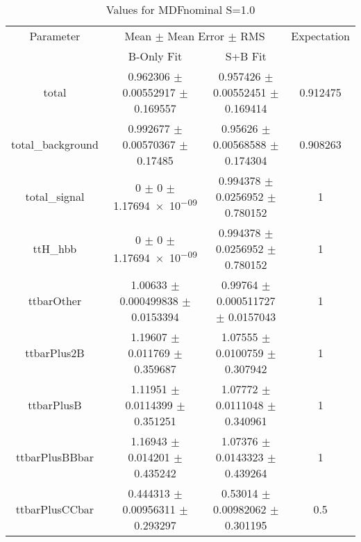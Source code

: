 \begin{table}
\centering
\caption{Values for MDFnominal S=1.0}
\begin{tabular}{cccc}
\toprule
Parameter & \multicolumn{2}{c}{Mean $\pm$ Mean Error $\pm$ RMS} & Expectation\\
 & B-Only Fit & S+B Fit & \\
\midrule
total & \num{0.962306} $\pm$ \num{0.00552917} $\pm$ \num{0.169557} & \num{0.957426} $\pm$ \num{0.00552451} $\pm$ \num{0.169414} & \num{0.912475}\\
total\_background & \num{0.992677} $\pm$ \num{0.00570367} $\pm$ \num{0.17485} & \num{0.95626} $\pm$ \num{0.00568588} $\pm$ \num{0.174304} & \num{0.908263}\\
total\_signal & \num{0} $\pm$ \num{0} $\pm$ \num{1.17694e-09} & \num{0.994378} $\pm$ \num{0.0256952} $\pm$ \num{0.780152} & \num{1}\\
ttH\_hbb & \num{0} $\pm$ \num{0} $\pm$ \num{1.17694e-09} & \num{0.994378} $\pm$ \num{0.0256952} $\pm$ \num{0.780152} & \num{1}\\
ttbarOther & \num{1.00633} $\pm$ \num{0.000499838} $\pm$ \num{0.0153394} & \num{0.99764} $\pm$ \num{0.000511727} $\pm$ \num{0.0157043} & \num{1}\\
ttbarPlus2B & \num{1.19607} $\pm$ \num{0.011769} $\pm$ \num{0.359687} & \num{1.07555} $\pm$ \num{0.0100759} $\pm$ \num{0.307942} & \num{1}\\
ttbarPlusB & \num{1.11951} $\pm$ \num{0.0114399} $\pm$ \num{0.351251} & \num{1.07772} $\pm$ \num{0.0111048} $\pm$ \num{0.340961} & \num{1}\\
ttbarPlusBBbar & \num{1.16943} $\pm$ \num{0.014201} $\pm$ \num{0.435242} & \num{1.07376} $\pm$ \num{0.0143323} $\pm$ \num{0.439264} & \num{1}\\
ttbarPlusCCbar & \num{0.444313} $\pm$ \num{0.00956311} $\pm$ \num{0.293297} & \num{0.53014} $\pm$ \num{0.00982062} $\pm$ \num{0.301195} & \num{0.5}\\
\bottomrule
\end{tabular}
\end{table}
